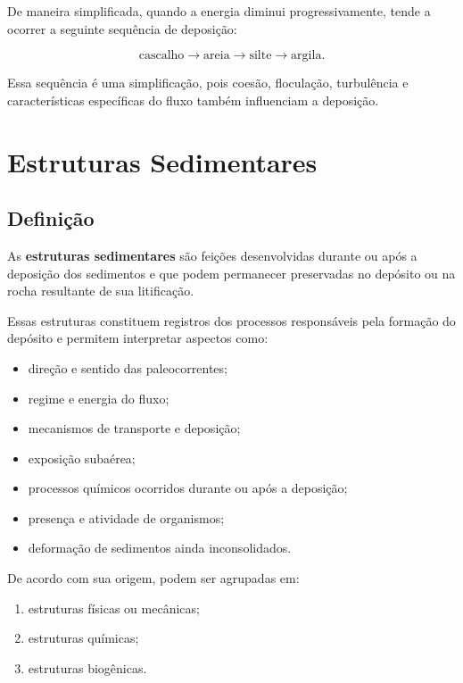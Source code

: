 \documentclass[a4paper,12pt]{article}
\theoremstyle{definition}
\theoremstyle{definition}
\theoremstyle{definition}
\begin{document}
De maneira simplificada, quando a energia diminui progressivamente, tende a
ocorrer a seguinte sequência de deposição:

\[
\text{cascalho}
\rightarrow
\text{areia}
\rightarrow
\text{silte}
\rightarrow
\text{argila}.
\]

Essa sequência é uma simplificação, pois coesão, floculação, turbulência e
características específicas do fluxo também influenciam a deposição.



\section{Estruturas Sedimentares}

\subsection{Definição}

As \textbf{estruturas sedimentares} são feições desenvolvidas durante ou após a
deposição dos sedimentos e que podem permanecer preservadas no depósito ou na
rocha resultante de sua litificação.

Essas estruturas constituem registros dos processos responsáveis pela formação
do depósito e permitem interpretar aspectos como:

\begin{itemize}
    \item direção e sentido das paleocorrentes;
    \item regime e energia do fluxo;
    \item mecanismos de transporte e deposição;
    \item exposição subaérea;
    \item processos químicos ocorridos durante ou após a deposição;
    \item presença e atividade de organismos;
    \item deformação de sedimentos ainda inconsolidados.
\end{itemize}

De acordo com sua origem, podem ser agrupadas em:

\begin{enumerate}
    \item estruturas físicas ou mecânicas;
    \item estruturas químicas;
    \item estruturas biogênicas.
\end{enumerate}
\end{document}
